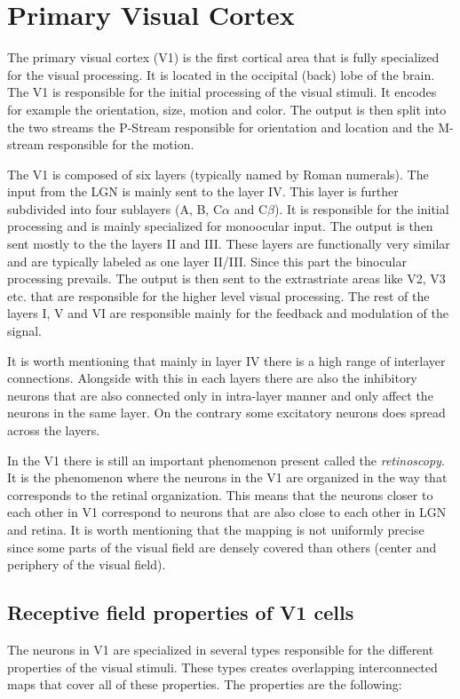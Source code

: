 \section{Primary Visual Cortex}
\label{sec:v1}
The primary visual cortex (V1) is the first cortical area that is fully specialized for 
the visual processing. It is located in the occipital (back) lobe of the brain. The 
V1 is responsible for the initial processing of the visual stimuli. It encodes for example
the orientation, size, motion and color. The output is then split into the two streams
the P-Stream responsible for orientation and location and the M-stream responsible for 
the motion.

The V1 is composed of six layers (typically named by Roman numerals). The input from 
the LGN is mainly sent to the layer IV. This layer is further subdivided into four 
sublayers (A, B, C$\alpha$ and C$\beta$). It is responsible for the initial processing
and is mainly specialized for monoocular input. The output is then sent mostly to the the 
layers II and III. These layers are functionally very similar and are typically labeled
as one layer II/III. Since this part the binocular processing prevails. The output is
then sent to the extrastriate areas like V2, V3 etc. that are responsible for the higher 
level visual processing. The rest of the layers I, V and VI are responsible mainly for 
the feedback and modulation of the signal. 

It is worth mentioning that mainly in layer IV there is a high range of interlayer connections.
Alongside with this in each layers there are also the inhibitory neurons that are 
also connected only in intra-layer manner and only affect the neurons in the same layer.
On the contrary some excitatory neurons does spread across the layers.

In the V1 there is still an important phenomenon present called the \emph{retinoscopy}.
It is the phenomenon where the neurons in the V1 are organized in the way that 
corresponds to the retinal organization. This means that the neurons closer to each
other in V1 correspond to neurons that are also close to each other in LGN and retina.
It is worth mentioning that the mapping is not uniformly precise since some parts of 
the visual field are densely covered than others (center and periphery of the visual field).

\subsection{Receptive field properties of V1 cells}
\label{subsec:receptive_field}
The neurons in V1 are specialized in several types responsible for the different properties
of the visual stimuli. These types creates overlapping interconnected maps that cover 
all of these properties. The properties are the following:

